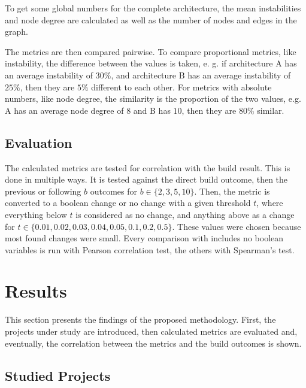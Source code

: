 \documentclass[conference]{IEEEtran}
\begin{document}
To get some global numbers for the complete architecture, the mean instabilities and node degree are calculated as well as the number of nodes and edges in the graph.

The metrics are then compared pairwise. To compare proportional metrics, like instability, the difference between the values is taken, e. g. if architecture A has an average instability of $30\%$, and architecture B has an average instability of $25\%$, then they are $5\%$ different to each other. For metrics with absolute numbers, like node degree, the similarity is the proportion of the two values, e.g. A has an average node degree of $8$ and B has $10$, then they are $80\%$ similar. 

\subsection{Evaluation}

The calculated metrics are tested for correlation with the build result. This is done in multiple ways. It is tested against the direct build outcome, then the previous or following $b$ outcomes for $b \in \{2, 3, 5, 10\}$. Then, the metric is converted to a boolean change or no change with a given threshold $t$, where everything below $t$ is considered as no change, and anything above as a change for $t \in \{0.01, 0.02, 0.03, 0.04, 0.05, 0.1, 0.2, 0.5\}$. These values were chosen because most found changes were small. Every comparison with includes no boolean variables is run with Pearson correlation test, the others with Spearman's test. 

\section{Results}

This section presents the findings of the proposed methodology. First, the projects under study are introduced, then calculated metrics are evaluated and, eventually, the correlation between the metrics and the build outcomes is shown.

\subsection{Studied Projects}


\end{document}

